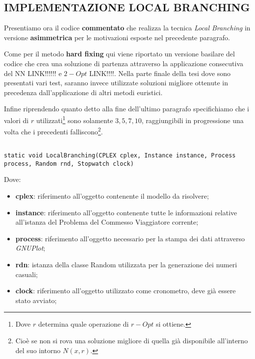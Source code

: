 \documentclass[11pt]{article}
\begin{document}
\subsection*{IMPLEMENTAZIONE LOCAL BRANCHING}
\label{sec:ImplementazioneLocalBranchS}

Presentiamo ora il codice \textbf{commentato} che realizza la tecnica \textit{Local Branching} in versione \textbf{asimmetrica} per le motivazioni esposte nel precedente paragrafo.

Come per il metodo \textbf{hard fixing} qui viene riportato un versione basilare del codice che crea una soluzione di partenza attraverso la applicazione consecutiva del NN LINK!!!!!! e $2-Opt$ LINK!!!!. Nella parte finale della tesi dove sono presentati vari test, saranno invece utilizzate soluzioni migliore ottenute in precedenza dall'applicazione di altri metodi euristici.

Infine riprendendo quanto detto alla fine dell'ultimo paragrafo specifichiamo che i valori di $r$ utilizzati\footnote{Dove $r$ determina quale operazione di $r-Opt$ si ottiene.} sono solamente ${3, 5, 7, 10}$, raggiungibili in progressione una volta che i precedenti falliscono\footnote{Cioè se non si rova una soluzione migliore di quella già disponibile all'interno del suo intorno $N(x,r)$.}.

\begin{lstlisting}

static void LocalBranching(CPLEX cplex, Instance instance, Process process, Random rnd, Stopwatch clock)

\end{lstlisting}

Dove:

\begin{itemize}
    \item \textbf{cplex}: riferimento all'oggetto contenente il modello da risolvere;
    \item \textbf{instance}: riferimento all'oggetto contenente tutte le informazioni relative all'istanza del Problema del Commesso Viaggiatore corrente;
    \item \textbf{process}: riferimento all'oggetto necessario per la stampa dei dati attraverso \textit{GNUPlot};
    \item \textbf{rdn}: istanza della classe Random utilizzata per la generazione dei numeri casuali;
    \item \textbf{clock}: riferimento all'oggetto utilizzato come cronometro, deve già essere stato avviato;
\end{itemize}
\end{document}
